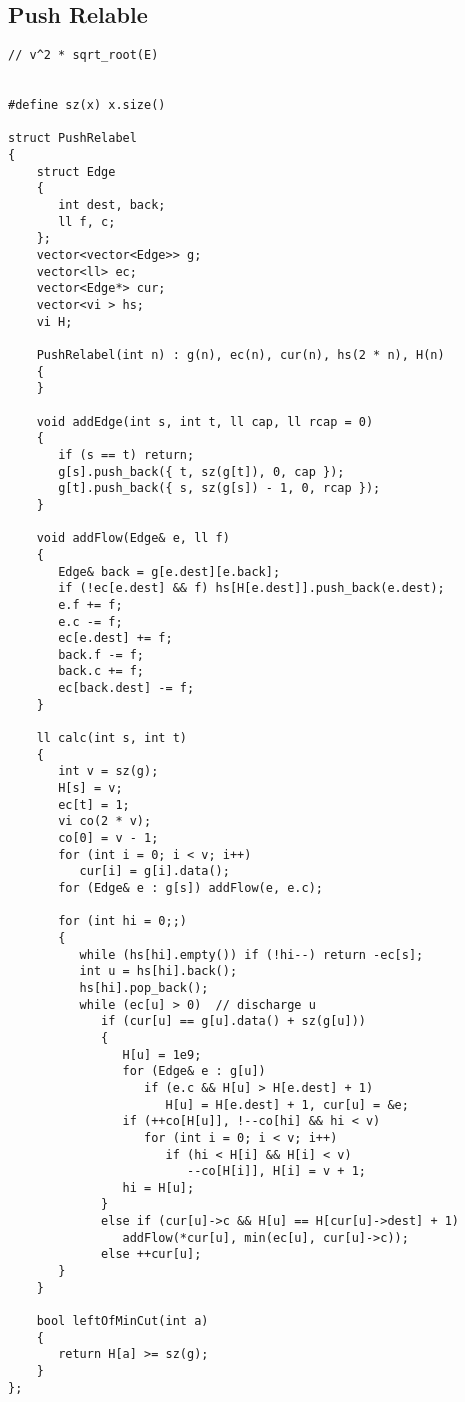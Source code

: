 \subsection{Push Relable}

\begin{lstlisting}[style=cpp]
// v^2 * sqrt_root(E)


#define sz(x) x.size()  
  
struct PushRelabel  
{  
    struct Edge  
    {  
       int dest, back;  
       ll f, c;  
    };  
    vector<vector<Edge>> g;  
    vector<ll> ec;  
    vector<Edge*> cur;  
    vector<vi > hs;  
    vi H;  
  
    PushRelabel(int n) : g(n), ec(n), cur(n), hs(2 * n), H(n)  
    {  
    }  
  
    void addEdge(int s, int t, ll cap, ll rcap = 0)  
    {  
       if (s == t) return;  
       g[s].push_back({ t, sz(g[t]), 0, cap });  
       g[t].push_back({ s, sz(g[s]) - 1, 0, rcap });  
    }  
  
    void addFlow(Edge& e, ll f)  
    {  
       Edge& back = g[e.dest][e.back];  
       if (!ec[e.dest] && f) hs[H[e.dest]].push_back(e.dest);  
       e.f += f;  
       e.c -= f;  
       ec[e.dest] += f;  
       back.f -= f;  
       back.c += f;  
       ec[back.dest] -= f;  
    }  
  
    ll calc(int s, int t)  
    {  
       int v = sz(g);  
       H[s] = v;  
       ec[t] = 1;  
       vi co(2 * v);  
       co[0] = v - 1;  
       for (int i = 0; i < v; i++)  
          cur[i] = g[i].data();  
       for (Edge& e : g[s]) addFlow(e, e.c);  
  
       for (int hi = 0;;)  
       {  
          while (hs[hi].empty()) if (!hi--) return -ec[s];  
          int u = hs[hi].back();  
          hs[hi].pop_back();  
          while (ec[u] > 0)  // discharge u    
			 if (cur[u] == g[u].data() + sz(g[u]))
             {  
                H[u] = 1e9;  
                for (Edge& e : g[u])  
                   if (e.c && H[u] > H[e.dest] + 1)  
                      H[u] = H[e.dest] + 1, cur[u] = &e;  
                if (++co[H[u]], !--co[hi] && hi < v)  
                   for (int i = 0; i < v; i++)  
                      if (hi < H[i] && H[i] < v)  
                         --co[H[i]], H[i] = v + 1;  
                hi = H[u];  
             }  
             else if (cur[u]->c && H[u] == H[cur[u]->dest] + 1)  
                addFlow(*cur[u], min(ec[u], cur[u]->c));  
             else ++cur[u];  
       }  
    }  
  
    bool leftOfMinCut(int a)  
    {  
       return H[a] >= sz(g);  
    }  
};
\end{lstlisting}

